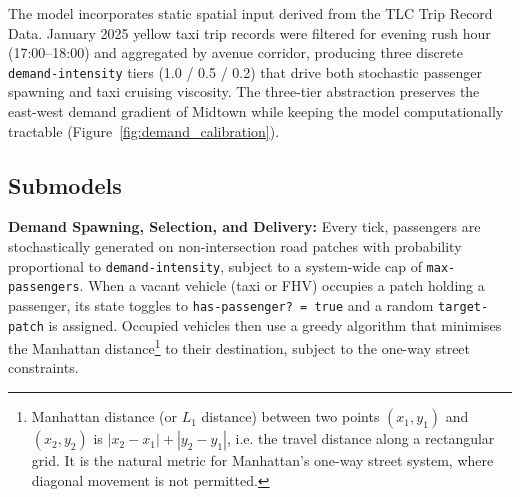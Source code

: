 \documentclass{article}
\begin{document}
The model incorporates static spatial input derived from the TLC Trip Record Data. January 2025 yellow taxi trip records were filtered for evening rush hour (17:00--18:00) and aggregated by avenue corridor, producing three discrete \texttt{demand-intensity} tiers (1.0 / 0.5 / 0.2) that drive both stochastic passenger spawning and taxi cruising viscosity. The three-tier abstraction preserves the east-west demand gradient of Midtown while keeping the model computationally tractable (Figure~\ref{fig:demand_calibration}).



\subsection{Submodels}


\textbf{Demand Spawning, Selection, and Delivery:} Every tick, passengers are stochastically generated on non-intersection road patches with probability proportional to \texttt{demand-intensity}, subject to a system-wide cap of \texttt{max-passengers}. When a vacant vehicle (taxi or FHV) occupies a patch holding a passenger, its state toggles to \texttt{has-passenger?~=~true} and a random \texttt{target-patch} is assigned. Occupied vehicles then use a greedy algorithm that minimises the Manhattan distance\footnote{Manhattan distance (or $L_1$ distance) between two points $(x_1, y_1)$ and $(x_2, y_2)$ is $|x_2 - x_1| + |y_2 - y_1|$, i.e. the travel distance along a rectangular grid. It is the natural metric for Manhattan's one-way street system, where diagonal movement is not permitted.} to their destination, subject to the one-way street constraints.
\end{document}
